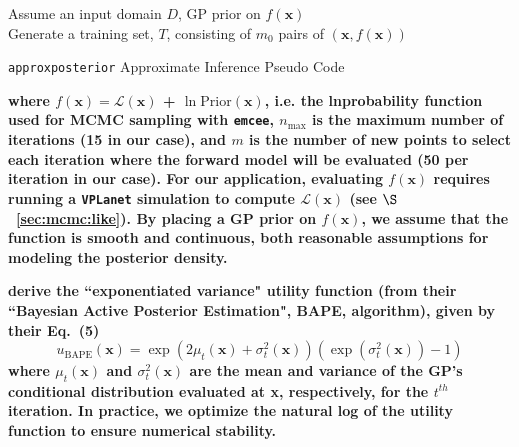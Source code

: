 \documentclass[twocolumn]{aastex62}
\newcommand{\xxx}[1]{{\textbf{#1}}}
\newcommand{\vplanet}[0]{\texttt{VPLanet}\xspace}
\newcommand{\emcee}[0]{\texttt{emcee}\xspace}
\newcommand{\approxposterior}[0]{\texttt{approxposterior}\xspace}
\begin{document}
\begin{algorithm}[H] \label{app:algo}
\SetAlgoLined
 Assume an input domain $D$, GP prior on $f(\textbf{x})$ \\
 Generate a training set, $T$, consisting of $m_0$ pairs of $(\textbf{x}, f(\textbf{x}))$ \\
\caption{\approxposterior Approximate Inference Pseudo Code}
\end{algorithm}
\xxx{where $f(\textbf{x}) = \mathcal{L}(\textbf{x})$ + $\ln \mathrm{Prior}(\textbf{x})$, i.e. the lnprobability function used for MCMC sampling with \emcee, $n_{\mathrm{max}}$ is the maximum number of iterations (15 in our case), and $m$ is the number of new points to select each iteration where the forward model will be evaluated (50 per iteration in our case). For our application, evaluating $f(\textbf{x})$ requires running a \vplanet simulation to compute $\mathcal{L}(\textbf{x})$ (see $\S$~\ref{sec:mcmc:like}). By placing a GP prior on $f(\textbf{x})$, we assume that the function is smooth and continuous, both reasonable assumptions for modeling the posterior density.}

\xxx{\citet{Kandasamy2017} derive the ``exponentiated variance" utility function (from their ``Bayesian Active Posterior Estimation", BAPE, algorithm), given by their Eq.~(5)}
\begin{equation} \label{app:eq:bape}
    u_{\textrm{BAPE}}(\textbf{x}) = \exp(2 \mu_t(\textbf{x}) + \sigma_t^2(\textbf{x}))(\exp(\sigma_t^2(\textbf{x})) - 1)
\end{equation}
\xxx{where $\mu_t(\textbf{x})$ and $\sigma_t^2(\textbf{x})$ are the mean and variance of the GP's conditional distribution evaluated at \textbf{x}, respectively, for the $t^{th}$ iteration. In practice, we optimize the natural log of the utility function to ensure numerical stability.}

\end{document}
